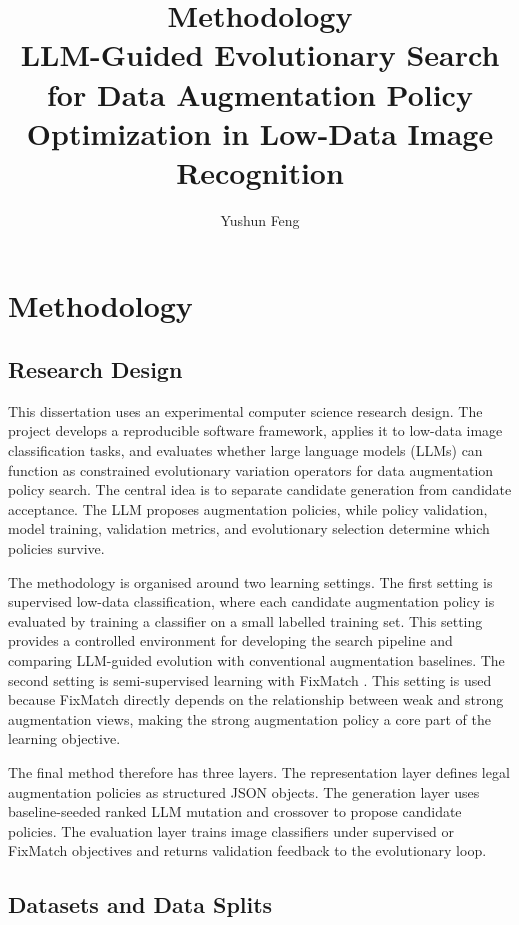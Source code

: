 \documentclass[12pt,a4paper]{report}
\title{Methodology\\
\large LLM-Guided Evolutionary Search for Data Augmentation Policy Optimization in Low-Data Image Recognition}
\author{Yushun Feng}
\date{}
\begin{document}
\maketitle

\chapter{Methodology}

\section{Research Design}

This dissertation uses an experimental computer science research design. The project develops a reproducible software framework, applies it to low-data image classification tasks, and evaluates whether large language models (LLMs) can function as constrained evolutionary variation operators for data augmentation policy search. The central idea is to separate candidate generation from candidate acceptance. The LLM proposes augmentation policies, while policy validation, model training, validation metrics, and evolutionary selection determine which policies survive.

The methodology is organised around two learning settings. The first setting is supervised low-data classification, where each candidate augmentation policy is evaluated by training a classifier on a small labelled training set. This setting provides a controlled environment for developing the search pipeline and comparing LLM-guided evolution with conventional augmentation baselines. The second setting is semi-supervised learning with FixMatch \citep{sohn2020fixmatch}. This setting is used because FixMatch directly depends on the relationship between weak and strong augmentation views, making the strong augmentation policy a core part of the learning objective.

The final method therefore has three layers. The representation layer defines legal augmentation policies as structured JSON objects. The generation layer uses baseline-seeded ranked LLM mutation and crossover to propose candidate policies. The evaluation layer trains image classifiers under supervised or FixMatch objectives and returns validation feedback to the evolutionary loop.

\section{Datasets and Data Splits}
\end{document}
